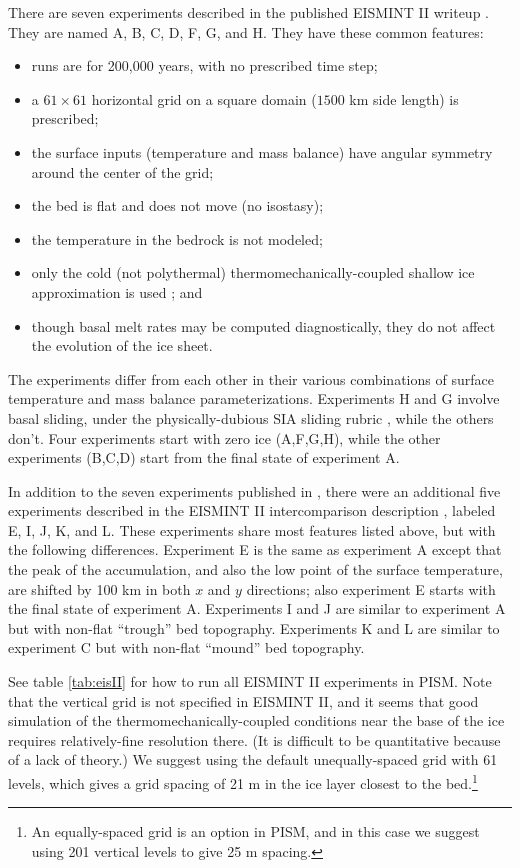 There are seven experiments described in the published EISMINT II writeup \cite{EISMINT00}.  They are named A, B, C, D, F, G, and H.  They have these common features:\begin{itemize}
\item runs are for 200,000 years, with no prescribed time step;
\item a $61\times 61$ horizontal grid on a square domain ($1500$ km side length) is prescribed;
\item the surface inputs (temperature and mass balance) have angular symmetry around the center of the grid;
\item the bed is flat and does not move (no isostasy);
\item the temperature in the bedrock is not modeled;
\item only the cold (not polythermal) thermomechanically-coupled shallow ice approximation is used \cite{EISMINT00}; and
\item though basal melt rates may be computed diagnostically, they do not affect the evolution of the ice sheet.
\end{itemize}
The experiments differ from each other in their various combinations of surface temperature and mass balance parameterizations.  Experiments H and G involve basal sliding, under the physically-dubious SIA sliding rubric \cite[Appendix B]{BBssasliding}, while the others don't.  Four experiments start with zero ice (A,F,G,H), while the other experiments (B,C,D) start from the final state of experiment A.

In addition to the seven experiments published in \cite{EISMINT00}, there were an additional five experiments described in the EISMINT II intercomparison description 
\cite{EISIIdescribe}, labeled E, I, J, K, and L.  These experiments share most features listed above, but with the following differences.  Experiment E is the same as experiment A except that the peak of the accumulation, and also the low point of the surface temperature, are shifted by 100 km in both $x$ and $y$ directions; also experiment E starts with the final state of experiment A.  Experiments I and J are similar to experiment A but with non-flat ``trough'' bed topography.  Experiments K and L are similar to experiment C but with non-flat ``mound'' bed topography.

See table \ref{tab:eisII} for how to run all EISMINT II experiments in PISM.  Note that the vertical grid is not specified in EISMINT II, and it seems that good simulation of the thermomechanically-coupled conditions near the base of the ice requires relatively-fine resolution there.  (It is difficult to be quantitative because of a lack of theory.)  We suggest using the default unequally-spaced grid with 61 levels, which gives a grid spacing of 21 m in the ice layer closest to the bed.\footnote{An equally-spaced grid is an option in PISM, and in this case we suggest using 201 vertical levels to give 25 m spacing.}

